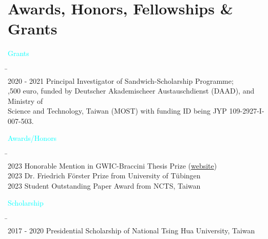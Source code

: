 \documentclass[11pt,a4paper,sans]{moderncv}
\begin{document}

\section{Awards, Honors, Fellowships \& Grants}
\textcolor{cyan}{Grants}
\begin{tabbing}
\hspace*{2.3cm} \= \hspace*{10cm} \\[-3ex]
2020 - 2021 \> Principal Investigator of Sandwich-Scholarship Programme;\\
,500 euro, funded by Deutscher Akademischeer Austauschdienst (DAAD), and Ministry of \\
\> Science and Technology, Taiwan (MOST) with funding ID being JYP 109-2927-I-007-503.
\end{tabbing}

\textcolor{cyan}{Awards/Honors}
\begin{tabbing}
\hspace*{2.3cm} \= \hspace*{10cm} \\[-3ex]
2023\> Honorable Mention in GWIC-Braccini Thesis Prize (\href{https://gwic.ligo.org/thesis-prize.html}{website}) \\
2023\> Dr. Friedrich F{\"o}rster Prize from University of T{\"u}bingen\\
2023\> Student Outstanding Paper Award from NCTS, Taiwan
\end{tabbing}

\textcolor{cyan}{Scholarship}
\begin{tabbing}
\hspace*{2.3cm} \= \hspace*{10cm} \\[-3ex]
2017 - 2020 \> Presidential Scholarship of National Tsing Hua University, Taiwan
\end{tabbing}
\end{document}
